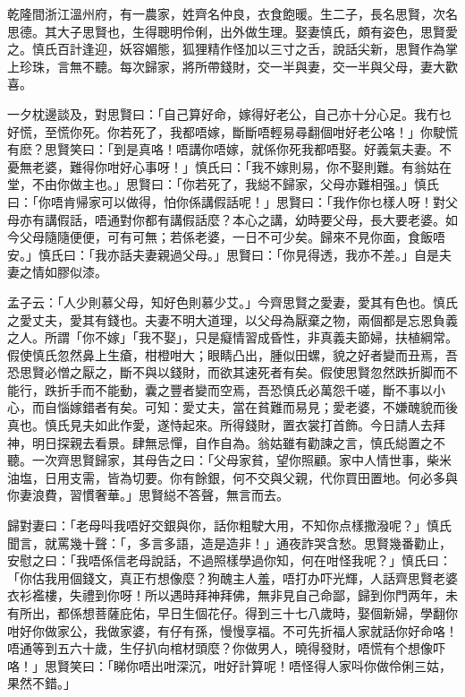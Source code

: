 \documentclass[a5paper, 12pt, openany]{book} %
\begin{document}
	乾隆間浙江溫州府，有一農家，姓齊名仲良，衣食飽暖。生二子，長名思賢，次名思德。其大子思賢也，生得聰明伶俐，出外做生理。娶妻慎氏，頗有姿色，思賢愛之。慎氏百計逢迎，妖容媚態，狐狸精作怪加以三寸之舌，說話尖新，思賢作為掌上珍珠，言無不聽。每次歸家，將所帶錢財，交一半與妻，交一半與父母，妻大歡喜。

	一夕枕邊談及，對思賢曰：「自己算好命，嫁得好老公，自己亦十分心足。我冇乜好慌，至慌你死。你若死了，我都唔嫁，斷斷唔輕易尋翻個咁好老公咯！」你駛慌有麽？思賢笑曰：「到是真咯！唔講你唔嫁，就係你死我都唔娶。好義氣夫妻。不憂無老婆，難得你咁好心事呀！」慎氏曰：「我不嫁則易，你不娶則難。有翁姑在堂，不由你做主也。」思賢曰：「你若死了，我縂不歸家，父母亦難相强。」慎氏曰：「你唔肯帰家可以做得，怕你係講假話呢！」思賢曰：「我作你乜樣人呀！對父母亦有講假話，唔通對你都有講假話麼？本心之講，幼時要父母，長大要老婆。如今父母隨隨便便，可有可無；若係老婆，一日不可少矣。歸來不見你面，食飯唔安。」慎氏曰：「我亦話夫妻親過父母。」思賢曰：「你見得透，我亦不差。」自是夫妻之情如膠似漆。

	孟子云：「人少則慕父母，知好色則慕少艾。」今齊思賢之愛妻，愛其有色也。慎氏之愛丈夫，愛其有錢也。夫妻不明大道理，以父母為厭棄之物，兩個都是忘恩負義之人。所謂「你不嫁」「我不娶」，只是癡情習成昏性，非真義夫節婦，扶植綱常。假使慎氏忽然鼻上生瘡，柑橙咁大；眼睛凸出，腫似田螺，貌之好者變而丑焉，吾恐思賢必憎之厭之，斷不與以錢財，而欲其速死者有矣。假使思賢忽然跌折脚而不能行，跌折手而不能動，囊之豐者變而空焉，吾恐慎氏必萬怨千嗟，斷不事以小心，而自惱嫁錯者有矣。可知：愛丈夫，當在貧難而易見；愛老婆，不嫌醜貌而後真也。慎氏見夫如此作愛，遂恃起來。所得錢財，置衣裳打首飾。今日請人去拜神，明日探親去看景。肆無忌憚，自作自為。翁姑雖有勸諫之言，慎氏縂置之不聽。一次齊思賢歸家，其母告之曰：「父母家貧，望你照顧。家中人情世事，柴米油塩，日用支需，皆為切要。你有餘銀，何不交與父親，代你買田置地。何必多與你妻浪費，習慣奢華。」思賢縂不答聲，無言而去。

	歸對妻曰：「老母呌我唔好交銀與你，話你粗駛大用，不知你点樣撒潑呢？」慎氏聞言，就罵幾十聲：「，多言多語，造是造非！」通夜詐哭含愁。思賢幾番勸止，安慰之曰：「我唔係信老母說話，不過照樣學過你知，何在咁怪我呢？」慎氏曰：「你估我用個錢文，真正冇想像麼？狗醜主人羞，唔打办吓光輝，人話齊思賢老婆衣衫襤樓，失禮到你呀！所以遇時拜神拜佛，無非見自己命鄙，歸到你門两年，未有所出，都係想菩薩庇佑，早日生個花仔。得到三十七八歲時，娶個新婦，學翻你咁好你做家公，我做家婆，有仔有孫，慢慢享福。不可先折福人家就話你好命咯！唔通等到五六十歲，生仔扒向棺材頭麼？你做男人，曉得發財，唔慌有个想像吓咯！」思賢笑曰：「睇你唔出咁深沉，咁好計算呢！唔怪得人家呌你做伶俐三姑，果然不錯。」
\end{document}
